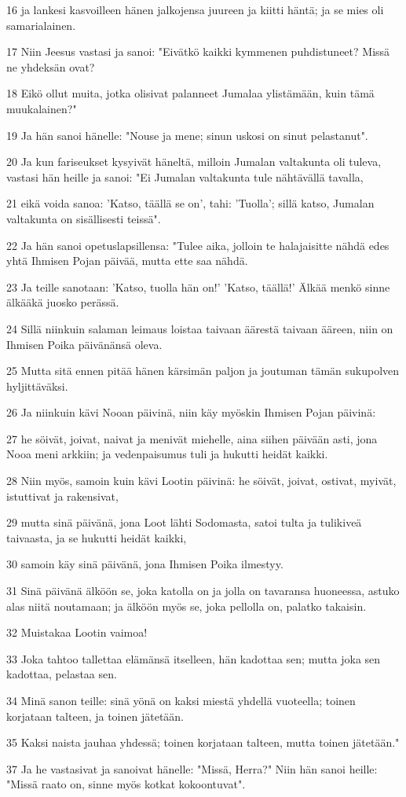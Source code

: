 \par 16 ja lankesi kasvoilleen hänen jalkojensa juureen ja kiitti häntä; ja se mies oli samarialainen.
\par 17 Niin Jeesus vastasi ja sanoi: "Eivätkö kaikki kymmenen puhdistuneet? Missä ne yhdeksän ovat?
\par 18 Eikö ollut muita, jotka olisivat palanneet Jumalaa ylistämään, kuin tämä muukalainen?"
\par 19 Ja hän sanoi hänelle: "Nouse ja mene; sinun uskosi on sinut pelastanut".
\par 20 Ja kun fariseukset kysyivät häneltä, milloin Jumalan valtakunta oli tuleva, vastasi hän heille ja sanoi: "Ei Jumalan valtakunta tule nähtävällä tavalla,
\par 21 eikä voida sanoa: 'Katso, täällä se on', tahi: 'Tuolla'; sillä katso, Jumalan valtakunta on sisällisesti teissä".
\par 22 Ja hän sanoi opetuslapsillensa: "Tulee aika, jolloin te halajaisitte nähdä edes yhtä Ihmisen Pojan päivää, mutta ette saa nähdä.
\par 23 Ja teille sanotaan: 'Katso, tuolla hän on!' 'Katso, täällä!' Älkää menkö sinne älkääkä juosko perässä.
\par 24 Sillä niinkuin salaman leimaus loistaa taivaan äärestä taivaan ääreen, niin on Ihmisen Poika päivänänsä oleva.
\par 25 Mutta sitä ennen pitää hänen kärsimän paljon ja joutuman tämän sukupolven hyljittäväksi.
\par 26 Ja niinkuin kävi Nooan päivinä, niin käy myöskin Ihmisen Pojan päivinä:
\par 27 he söivät, joivat, naivat ja menivät miehelle, aina siihen päivään asti, jona Nooa meni arkkiin; ja vedenpaisumus tuli ja hukutti heidät kaikki.
\par 28 Niin myös, samoin kuin kävi Lootin päivinä: he söivät, joivat, ostivat, myivät, istuttivat ja rakensivat,
\par 29 mutta sinä päivänä, jona Loot lähti Sodomasta, satoi tulta ja tulikiveä taivaasta, ja se hukutti heidät kaikki,
\par 30 samoin käy sinä päivänä, jona Ihmisen Poika ilmestyy.
\par 31 Sinä päivänä älköön se, joka katolla on ja jolla on tavaransa huoneessa, astuko alas niitä noutamaan; ja älköön myös se, joka pellolla on, palatko takaisin.
\par 32 Muistakaa Lootin vaimoa!
\par 33 Joka tahtoo tallettaa elämänsä itselleen, hän kadottaa sen; mutta joka sen kadottaa, pelastaa sen.
\par 34 Minä sanon teille: sinä yönä on kaksi miestä yhdellä vuoteella; toinen korjataan talteen, ja toinen jätetään.
\par 35 Kaksi naista jauhaa yhdessä; toinen korjataan talteen, mutta toinen jätetään."
\par 37 Ja he vastasivat ja sanoivat hänelle: "Missä, Herra?" Niin hän sanoi heille: "Missä raato on, sinne myös kotkat kokoontuvat".

